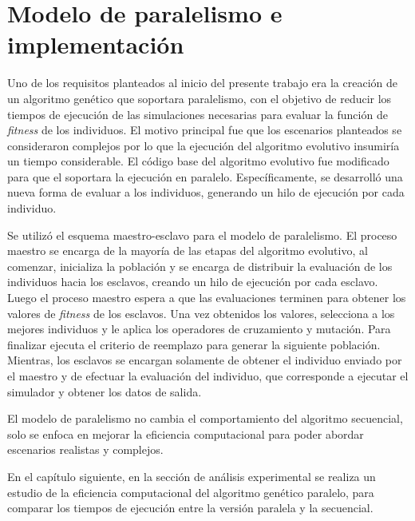 \section{Modelo de paralelismo e implementación}

Uno de los requisitos planteados al inicio del presente trabajo era la creación de un algoritmo genético que soportara paralelismo, con el objetivo de reducir los tiempos de ejecución de las simulaciones necesarias para evaluar la función de \emph{fitness} de los individuos. El motivo principal fue que los escenarios planteados se consideraron complejos por lo que la ejecución del algoritmo evolutivo insumiría un tiempo considerable. El código base del algoritmo evolutivo fue modificado para que el  soportara la ejecución en paralelo. Específicamente, se desarrolló una nueva forma de evaluar a los individuos, generando un hilo de ejecución por cada individuo.

Se utilizó el esquema maestro-esclavo para el modelo de paralelismo. El proceso maestro se encarga de la mayoría de las etapas del algoritmo evolutivo, al comenzar, inicializa la población y se encarga de distribuir la evaluación de los individuos hacia los esclavos, creando un hilo de ejecución por cada esclavo. Luego el proceso maestro espera a que las evaluaciones terminen para obtener los valores de \emph{fitness} de los esclavos. Una vez obtenidos los valores, selecciona a los mejores individuos y le aplica los operadores de cruzamiento y mutación. Para finalizar ejecuta el criterio de reemplazo para generar la siguiente población. Mientras, los esclavos se encargan solamente de obtener el individuo enviado por el maestro y de efectuar la evaluación del individuo, que corresponde a ejecutar el simulador y obtener los datos de salida. 

El modelo de paralelismo no cambia el comportamiento del algoritmo secuencial, solo se enfoca en mejorar la eficiencia computacional para poder abordar escenarios realistas y complejos.

En el capítulo siguiente, en la sección de análisis experimental se realiza un estudio de la eficiencia computacional del algoritmo genético paralelo, para comparar los tiempos de ejecución entre la versión paralela y la secuencial.